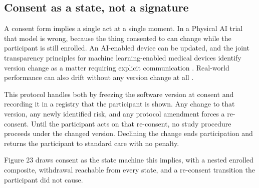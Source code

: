 \vspace{0.30em}

\subsection{Consent as a state, not a signature}

A consent form implies a single act at a single moment. In a Physical AI trial
that model is wrong, because the thing consented to can change while the
participant is still enrolled. An AI-enabled device can be updated, and the
joint transparency principles for machine learning-enabled medical devices
identify version change as a matter requiring explicit communication
\cite{FDATrans2024}. Real-world performance can also drift without any version
change at all \cite{FDARealW2025}.

This protocol handles both by freezing the software version at consent and
recording it in a registry that the participant is shown. Any change to that
version, any newly identified risk, and any protocol amendment forces a
re-consent. Until the participant acts on that re-consent, no study procedure
proceeds under the changed version. Declining the change ends participation and
returns the participant to standard care with no penalty.

Figure 23 draws consent as the state machine this implies, with a nested
enrolled composite, withdrawal reachable from every state, and a re-consent
transition the participant did not cause.

